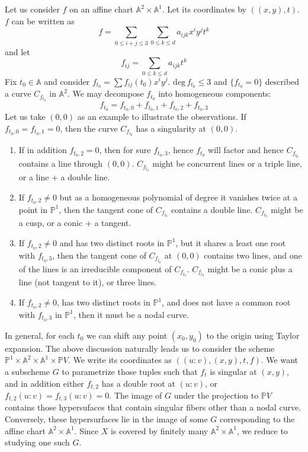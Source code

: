 \documentclass[12pt]{article}
\theoremstyle{plain}
\theoremstyle{definition}
\newcommand{\IA}{\mathbb{A}}
\newcommand{\IP}{\mathbb{P}}
\renewcommand{\deg}{\mathrm{deg}\,}
\newcommand{\<}{\langle}
\renewcommand{\>}{\rangle}
\begin{document}
Let us consider $f$ on an affine chart $\IA^2 \times \IA^1$. Let its coordinates by $((x, y), t)$. $f$ can be written as
$$ f = \sum_{0 \le i + j \le 3} \sum_{0 \le k \le d} a_{ijk} x^i y^j t^k $$ and let 
$$ f_{ij} = \sum_{0 \le k \le d} a_{ijk} t^k $$
Fix $t_0 \in \IA$ and consider $f_{t_0} = \sum f_{ij}(t_0) x^i y^j$. $\deg f_{t_0} \le 3$ and $\{f_{t_0} = 0 \}$ described a curve $C_{f_{t_0}}$ in $\IA^2$. We may decompose $f_{t_0}$ into homogeneous components:
$$ f_{t_0} = f_{t_0, 0} + f_{t_0, 1} + f_{t_0, 2} + f_{t_0, 3} $$
Let us take $(0, 0)$ as an example to illustrate the observations. If $f_{t_0, 0} = f_{t_0, 1} = 0$, then the curve $C_{f_{t_0}}$ has a singularity at $(0, 0)$. 

\begin{enumerate}
\item If in addition $f_{t_0, 2} = 0$, then for sure $f_{t_0, 3}$, hence $f_{t_0}$ will factor and hence $C_{f_{t_0}}$ contains a line through $(0, 0)$. $C_{f_{t_0}}$ might be concurrent lines or a triple line, or a line + a double line. 

\item If $f_{t_0, 2} \neq 0$ but as a homogeneous polynomial of degree it vanishes twice at a point in $\IP^1$, then the tangent cone of $C_{f_{t_0}}$ contains a double line. $C_{f_{t_0}}$ might be a cusp, or a conic + a tangent. 

\item If $f_{t_0, 2} \neq 0$ and has two distinct roots in $\IP^1$, but it shares a least one root with $f_{t_0, 3}$, then the tangent cone of $C_{f_{t_0}}$ at $(0, 0)$ contains two lines, and one of the lines is an irreducible component of $C_{f_{t_0}}$. $C_{f_{t_0}}$ might be a conic plus a line (not tangent to it), or three lines. 

\item If $f_{t_0, 2} \neq 0$, has two distinct roots in $\IP^1$, and does not have a common root with $f_{t_0, 3}$ in $\IP^1$, then it must be a nodal curve. 
\end{enumerate}
In general, for each $t_0$ we can shift any point $(x_0, y_0)$ to the origin using Taylor expansion.
The above discussion naturally leads us to consider the scheme $\IP^1 \times \IA^2 \times \IA^1 \times \IP V$. We write its coordinates as $((u : v), (x, y), t, f)$. We want a subscheme $G$ to parametrize those tuples such that $f_t$ is singular at $(x, y)$, and in addition either $f_{t, 2}$ has a double root at $(u : v)$, or $f_{t, 2}(u : v) = f_{t, 3}(u : v) = 0$. The image of $G$ under the projection to $\IP V$ contains those hypersufaces that contain singular fibers other than a nodal curve. Conversely, these hypersurfaces lie in the image of some $G$ corresponding to the affine chart $\IA^2 \times \IA^1$. Since $X$ is covered by finitely many $\IA^2 \times \IA^1$, we reduce to studying one such $G$. 
\end{document}
